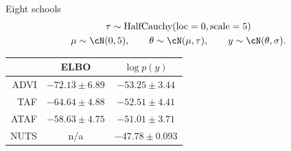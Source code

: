 
\begin{frame}{Eight schools \parencite{rubin1981estimation}}
    \begin{gather*}
        \tau \sim \text{HalfCauchy}(\text{loc}=0, \text{scale}=5)\\
        \mu \sim \cN(0, 5),\qquad
        \theta \sim \cN(\mu, \tau),\qquad
        y \sim \cN(\theta, \sigma) .
    \end{gather*}

    \begin{table}[htbp]
        \centering
        \begin{tabular}{rcc}
            \toprule
                      & ELBO                & $\log p(y)$       \\
            \midrule
            ADVI      & $-72.13 \pm 6.89$    & $-53.25 \pm 3.44$ \\
            TAF       & $-64.64 \pm 4.88$    & $-52.51 \pm 4.41$ \\
            ATAF      & $\mathbf{-58.63} \pm 4.75$    & $\mathbf{-51.01} \pm 3.71$ \\
            \hline
            NUTS      & n/a                  & $-47.78 \pm 0.093$ \\\bottomrule
        \end{tabular}
        \label{tab:eight_schools}
    \end{table}
\end{frame}

